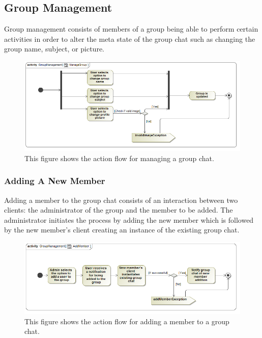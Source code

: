 \documentclass[11pt]{article}
\begin{document}
\subsection{Group Management}
Group management consists of members of a group being able to perform certain activities in order to alter the meta state of the group chat such as changing the group name, subject, or picture.
\begin{figure}[H]
\centering
\includegraphics[width=5in]{./images/activity_manage_group.png}
\caption[Manage Group Activity Diagram]{This figure shows the action flow for managing a group chat.}
\label{ad-manage-group}
\end{figure}
\subsubsection{Adding A New Member}
Adding a member to the group chat consists of an interaction between two clients: the administrator of the group and the member to be added. The administrator initiates the process by adding the new member which is followed by the new member's client creating an instance of the existing group chat.
\begin{figure}[H]
\centering
\includegraphics[width=5in]{./images/activity_add_member.png}
\caption[Add Member Activity Diagram]{This figure shows the action flow for adding a member to a group chat.}
\label{ad-add-member}
\end{figure}
\end{document}
